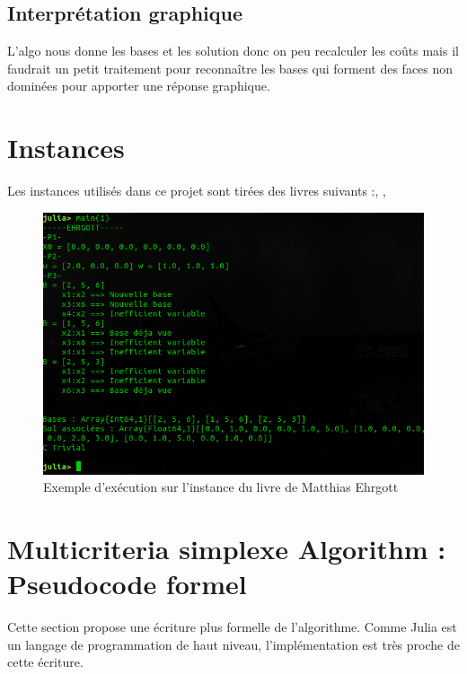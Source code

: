 \documentclass[a4paper,10pt]{article}
\theoremstyle{plain}
\begin{document}
\subsection{Interprétation graphique}
L'algo nous donne les bases et les solution donc on peu recalculer les coûts mais il faudrait un petit traitement pour reconnaître les bases qui forment des faces non dominées pour apporter une réponse graphique.



\section{Instances}
Les instances utilisés dans ce projet sont tirées des livres suivants :\cite{ehrgott2005multicriteria}, \cite{steuer1986multiple}, \cite{zeleny1973multiple}

\begin{figure}[htb!]
  \centering
  \includegraphics[scale=0.5]{doc/Ehrgott.png}
  \caption{Exemple d'exécution sur l'instance du livre de Matthias Ehrgott\cite{ehrgott2005multicriteria}}
  \label{fig:Ehrgott}
\end{figure}


\vfill
\break

\section{Multicriteria simplexe Algorithm : Pseudocode formel}
Cette section propose une écriture plus formelle de l'algorithme. Comme Julia est un langage de programmation de haut niveau, l'implémentation est très proche de cette écriture.
\end{document}
